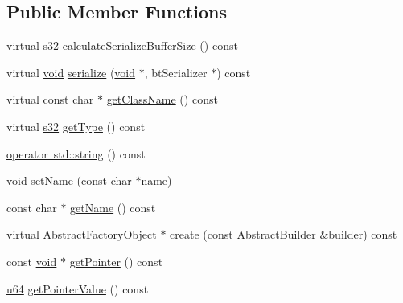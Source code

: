 \subsection*{Public Member Functions}
\begin{DoxyCompactItemize}
\item 
virtual \mbox{\hyperlink{_util_8h_aa62c75d314a0d1f37f79c4b73b2292e2}{s32}} \mbox{\hyperlink{classnjli_1_1_textbox_h_u_d_a770a618174161243eaded9c652e31fb9}{calculate\+Serialize\+Buffer\+Size}} () const
\item 
virtual \mbox{\hyperlink{_thread_8h_af1e856da2e658414cb2456cb6f7ebc66}{void}} \mbox{\hyperlink{classnjli_1_1_textbox_h_u_d_a0d9380b019b96de234c7a098ddbf5c7b}{serialize}} (\mbox{\hyperlink{_thread_8h_af1e856da2e658414cb2456cb6f7ebc66}{void}} $\ast$, bt\+Serializer $\ast$) const
\item 
virtual const char $\ast$ \mbox{\hyperlink{classnjli_1_1_textbox_h_u_d_a72f4534b34d0ba712ec4ecd604bda84a}{get\+Class\+Name}} () const
\item 
virtual \mbox{\hyperlink{_util_8h_aa62c75d314a0d1f37f79c4b73b2292e2}{s32}} \mbox{\hyperlink{classnjli_1_1_textbox_h_u_d_a2772cd4442dd8c315ca383b598c22be9}{get\+Type}} () const
\item 
\mbox{\hyperlink{classnjli_1_1_textbox_h_u_d_ae1257bff3f09f789d694cee09e95ff9b}{operator std\+::string}} () const
\item 
\mbox{\hyperlink{_thread_8h_af1e856da2e658414cb2456cb6f7ebc66}{void}} \mbox{\hyperlink{classnjli_1_1_textbox_h_u_d_a087eb5f8d9f51cc476f12f1d10a3cb95}{set\+Name}} (const char $\ast$name)
\item 
const char $\ast$ \mbox{\hyperlink{classnjli_1_1_textbox_h_u_d_ad41266885be835f3ee602311e20877a4}{get\+Name}} () const
\item 
virtual \mbox{\hyperlink{classnjli_1_1_abstract_factory_object}{Abstract\+Factory\+Object}} $\ast$ \mbox{\hyperlink{classnjli_1_1_textbox_h_u_d_a83a8876ae63b92804004cf3febe76573}{create}} (const \mbox{\hyperlink{classnjli_1_1_abstract_builder}{Abstract\+Builder}} \&builder) const
\item 
const \mbox{\hyperlink{_thread_8h_af1e856da2e658414cb2456cb6f7ebc66}{void}} $\ast$ \mbox{\hyperlink{classnjli_1_1_textbox_h_u_d_ac4ca71716ed832be357f15f8262c8448}{get\+Pointer}} () const
\item 
\mbox{\hyperlink{_util_8h_ad758b7a5c3f18ed79d2fcd23d9f16357}{u64}} \mbox{\hyperlink{classnjli_1_1_textbox_h_u_d_a4ffddf141a426a5a07d0ac19f1913811}{get\+Pointer\+Value}} () const
\item 

\end{DoxyCompactItemize}
